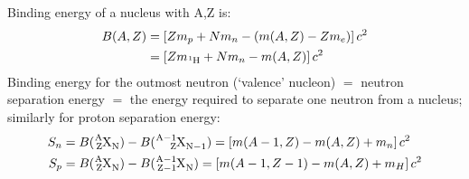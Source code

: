 \documentclass{school-22.101-notes}
\begin{document}
Binding energy of a nucleus with A,Z is:
\begin{align} 
B(A,Z) &= \left[ Z m_p + N m_n - (m(A,Z) - Z m_e) \right] c^2 \\
&= \left[ Z m_{\ce{^1 H}} + N m_n - m(A,Z) \right] c^2
\end{align}
Binding energy for the outmost neutron (`valence' nucleon) $=$ neutron separation energy $=$ the energy required to separate one neutron from a nucleus; similarly for proton separation energy: 
\begin{align}
S_n &= B(\ce{^A_Z X_N}) -B(\ce{^{A-1}_Z X_{N-1}}) = \left[ m(A-1, Z) - m(A,Z) + m_n \right] c^2 \\
S_p &= B(\ce{^A_Z X_N}) -B(\ce{^{A-1}_{Z-1} X_{N}}) = \left[ m(A-1, Z-1) - m(A,Z) + m_{H} \right] c^2
\end{align}
\end{document}
